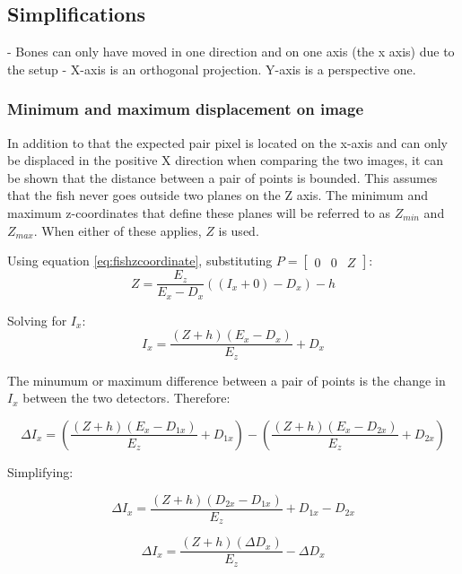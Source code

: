 \subsection{Simplifications}
- Bones can only have moved in one direction and on one axis (the x axis) due to the setup
- X-axis is an orthogonal projection. Y-axis is a perspective one.

\subsubsection{Minimum and maximum displacement on image}
In addition to that the expected pair pixel is located on the x-axis and can only be displaced in the positive X direction when comparing the two images, it can be shown that the distance between a pair of points is bounded. This assumes that the fish never goes outside two planes on the Z axis. The minimum and maximum z-coordinates that define these planes will be referred to as $Z_{min}$ and $Z_{max}$. When either of these applies, $Z$ is used.

Using equation \ref{eq:fishzcoordinate}, substituting $P = [\begin{matrix}0 & 0 & Z\end{matrix}]$:
\begin{equation}
Z = \frac{E_z}{E_x - D_x}((I_x + 0) - D_x) - h 
\end{equation}

Solving for $I_x$:
\begin{equation}
I_x = \frac{(Z + h)(E_x - D_x)}{E_z} + D_x 
\end{equation}

The minumum or maximum difference between a pair of points is the change in $I_x$ between the two detectors. Therefore:

\begin{equation}
\Delta I_x = \left(\frac{(Z + h)(E_x - D_{1x})}{E_z} + D_{1x}\right) - \left(\frac{(Z + h)(E_x - D_{2x})}{E_z} + D_{2x}\right)
\end{equation}

Simplifying:

\begin{equation}
\Delta I_x = \frac{(Z + h)(D_{2x} - D_{1x})}{E_z} + D_{1x} - D_{2x}
\end{equation}

\begin{equation}
\Delta I_x = \frac{(Z + h)(\Delta D_x)}{E_z} - \Delta D_x
\end{equation}

